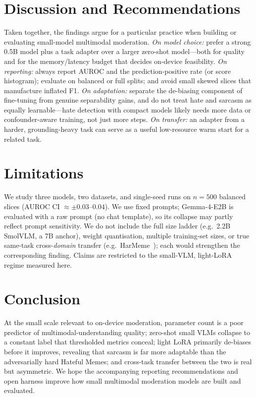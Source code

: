 \documentclass[sigconf,nonacm]{acmart}
\begin{document}
\section{Discussion and Recommendations}
Taken together, the findings argue for a particular practice when building or evaluating
small-model multimodal moderation. \emph{On model choice:} prefer a strong 0.5B model plus
a task adapter over a larger zero-shot model---both for quality and for the memory/latency
budget that decides on-device feasibility. \emph{On reporting:} always report AUROC and
the prediction-positive rate (or score histogram); evaluate on balanced or full splits;
and avoid small skewed slices that manufacture inflated F1. \emph{On adaptation:} separate
the de-biasing component of fine-tuning from genuine separability gains, and do not treat
hate and sarcasm as equally learnable---hate detection with compact models likely needs
more data or confounder-aware training, not just more steps. \emph{On transfer:} an
adapter from a harder, grounding-heavy task can serve as a useful low-resource warm start
for a related task.

\section{Limitations}
We study three models, two datasets, and single-seed runs on $n{=}500$ balanced slices
(AUROC CI $\approx\pm0.03$--$0.04$). We use fixed prompts; Gemma-4-E2B is evaluated with a
raw prompt (no chat template), so its collapse may partly reflect prompt sensitivity. We
do not include the full size ladder (e.g.\ 2.2B SmolVLM, a 7B anchor), weight
quantisation, multiple training-set sizes, or true same-task cross-\emph{domain} transfer
(e.g.\ HarMeme~\cite{pramanick2021harmeme}); each would strengthen the corresponding
finding. Claims are restricted to the small-VLM, light-LoRA regime measured here.

\section{Conclusion}
At the small scale relevant to on-device moderation, parameter count is a poor predictor
of multimodal-understanding quality; zero-shot small VLMs collapse to a constant label
that thresholded metrics conceal; light LoRA primarily de-biases before it improves,
revealing that sarcasm is far more adaptable than the adversarially hard Hateful Memes;
and cross-task transfer between the two is real but asymmetric. We hope the accompanying
reporting recommendations and open harness improve how small multimodal moderation models
are built and evaluated.




\end{document}
